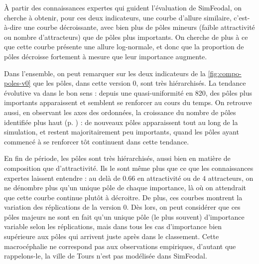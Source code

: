 À partir des connaissances expertes qui guident l'évaluation de SimFeodal, on cherche à obtenir, pour ces deux indicateurs, une courbe d'allure similaire, c'est-à-dire une courbe décroissante, avec bien plus de pôles mineurs (faible attractivité ou nombre d'attracteurs) que de pôles plus importants. On cherche de plus à ce que cette courbe présente une allure log-normale, et donc que la proportion de pôles décroisse fortement à mesure que leur importance augmente.


\begin{mdframed}[backgroundcolor=gray!10,footnoteinside=false]
	Dans l'ensemble, on peut remarquer sur les deux indicateurs de la \cref{fig:compo-poles-v0} que les pôles, dans cette version 0, sont très hiérarchisés. La tendance \og évolutive va dans le bon sens : depuis une quasi-uniformité en 820, des pôles plus importants apparaissent et semblent se renforcer au cours du temps. On retrouve aussi, en observant les axes des ordonnées, la croissance du nombre de pôles identifiée plus haut (p. \pageref{para:nb-poles}) : de nouveaux pôles apparaissent tout au long de la simulation, et restent majoritairement peu importants, quand les pôles ayant commencé à se renforcer tôt continuent dans cette tendance.
	
	En fin de période, les pôles sont très hiérarchisés, aussi bien en matière de composition que d'attractivité. Ils le sont même plus que ce que les connaissances expertes laissent entendre : au delà de $0.66$ en attractivité ou de $4$ attracteurs, on ne dénombre plus qu'un unique pôle de chaque importance, là où on attendrait que cette courbe continue plutôt à décroitre.
	De plus, ces courbes montrent la variation des réplications de la version 0.
	Dès lors, on peut considérer que ces pôles majeurs ne sont en fait qu'un unique pôle (le plus souvent) d'importance variable selon les réplications, mais dans tous les cas d'importance bien supérieure aux pôles qui arrivent juste après dans le classement. Cette macrocéphalie ne correspond pas aux observations empiriques, d'autant que rappelons-le, la ville de Tours n'est pas modélisée dans SimFeodal.	
	

\end{mdframed}

